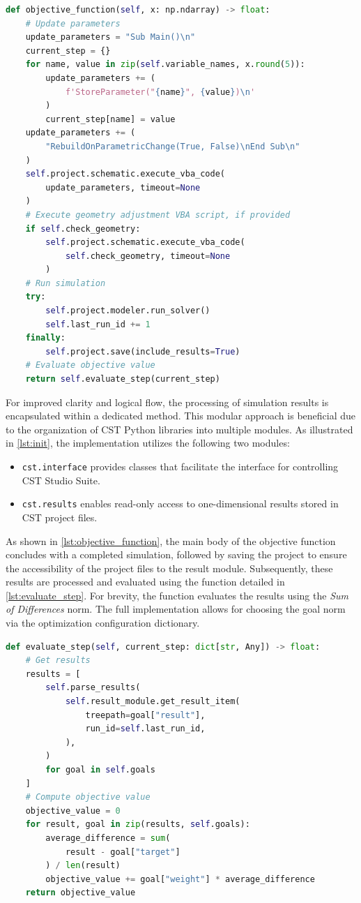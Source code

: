 \documentclass[11pt,a4paper,twoside,openany]{report}
\begin{document}
\begin{lstlisting}[caption={Objective function}, label={lst:objective_function}, language=Python]
def objective_function(self, x: np.ndarray) -> float:
    # Update parameters
    update_parameters = "Sub Main()\n"
    current_step = {}
    for name, value in zip(self.variable_names, x.round(5)):
        update_parameters += (
            f'StoreParameter("{name}", {value})\n'
        )
        current_step[name] = value
    update_parameters += (
        "RebuildOnParametricChange(True, False)\nEnd Sub\n"
    )
    self.project.schematic.execute_vba_code(
        update_parameters, timeout=None
    )
    # Execute geometry adjustment VBA script, if provided
    if self.check_geometry:
        self.project.schematic.execute_vba_code(
            self.check_geometry, timeout=None
        )
    # Run simulation
    try:
        self.project.modeler.run_solver()
        self.last_run_id += 1
    finally:
        self.project.save(include_results=True)
    # Evaluate objective value
    return self.evaluate_step(current_step)
\end{lstlisting}

For improved clarity and logical flow, the processing of simulation results is encapsulated within a dedicated method. This modular approach is beneficial due to the organization of CST Python libraries into multiple modules. As illustrated in \cref{lst:init}, the implementation utilizes the following two modules:
\begin{itemize}
    \item \texttt{cst.interface} provides classes that facilitate the interface for controlling CST Studio Suite.
    \item \texttt{cst.results} enables read-only access to one-dimensional results stored in CST project files.
\end{itemize}
As shown in \cref{lst:objective_function}, the main body of the objective function concludes with a completed simulation, followed by saving the project to ensure the accessibility of the project files to the result module. Subsequently, these results are processed and evaluated using the function detailed in \cref{lst:evaluate_step}. For brevity, the function evaluates the results using the \emph{Sum of Differences} norm. The full implementation allows for choosing the goal norm 
via the optimization configuration dictionary.

\begin{lstlisting}[caption={Optimization step evaluation}, label={lst:evaluate_step}, language=Python]
def evaluate_step(self, current_step: dict[str, Any]) -> float:
    # Get results
    results = [
        self.parse_results(
            self.result_module.get_result_item(
                treepath=goal["result"],
                run_id=self.last_run_id,
            ),
        )
        for goal in self.goals
    ]
    # Compute objective value
    objective_value = 0
    for result, goal in zip(results, self.goals):
        average_difference = sum(
            result - goal["target"]
        ) / len(result)
        objective_value += goal["weight"] * average_difference
    return objective_value
\end{lstlisting}
\end{document}
